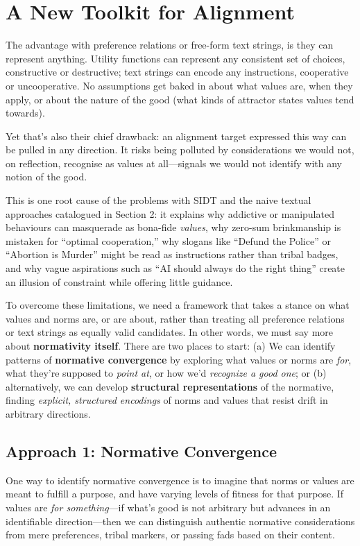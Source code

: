 \section{A New Toolkit for Alignment}
The advantage with preference relations or free-form text strings, is they can represent anything. Utility functions can represent any consistent set of choices, constructive or destructive; text strings can encode any instructions, cooperative or uncooperative. No assumptions get baked in about what values are, when they apply, or about the nature of the good (what kinds of attractor states values tend towards).

Yet that's also their chief drawback: an alignment target expressed this way can be pulled in any direction. It risks being polluted by considerations we would not, on reflection, recognise as values at all—signals we would not identify with any notion of the good.

This is one root cause of the problems with SIDT and the naive textual approaches catalogued in Section 2: it explains why addictive or manipulated behaviours can masquerade as bona-fide \textit{values}, why zero-sum brinkmanship is mistaken for ``optimal cooperation,'' why slogans like ``Defund the Police'' or ``Abortion is Murder'' might be read as instructions rather than tribal badges, and why vague aspirations such as ``AI should always do the right thing'' create an illusion of constraint while offering little guidance.

To overcome these limitations, we need a framework that takes a stance on what values and norms are, or are about, rather than treating all preference relations or text strings as equally valid candidates. In other words, we must say more about \textbf{normativity itself}.  There are two places to start: (a) We can identify patterns of \textbf{normative convergence} by exploring what values or norms are \textit{for}, what they're supposed to \textit{point at}, or how we'd \textit{recognize a good one}; or (b) alternatively, we can develop \textbf{structural representations} of the normative, finding \textit{explicit, structured encodings} of norms and values that resist drift in arbitrary directions.

\subsection{Approach 1: Normative Convergence}

One way to identify normative convergence is to imagine that norms or values are meant to fulfill a purpose, and have varying levels of fitness for that purpose. If values are \textit{for something}—if what's good is not arbitrary but advances in an identifiable direction—then we can distinguish authentic normative considerations from mere preferences, tribal markers, or passing fads based on their content.

